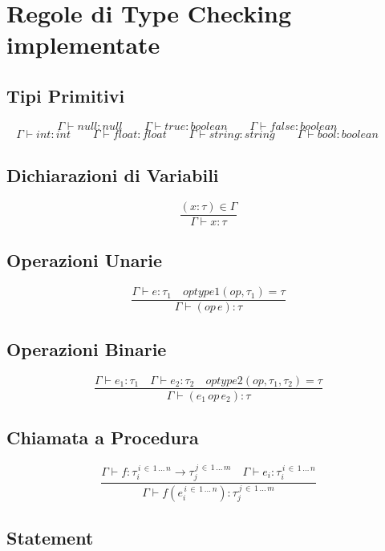\documentclass[a4paper,12pt]{article}
\newcommand\mi[1]{\mathit{#1}}
\begin{document}
	\newpage
    \section{Regole di Type Checking implementate}
    \subsection{Tipi Primitivi}
    \[
        \Gamma \vdash null \colon null \qquad
        \Gamma \vdash true \colon boolean \qquad
        \Gamma \vdash false \colon boolean \qquad
    \]
    \[
        \Gamma \vdash \mi{int} \colon int \qquad
        \Gamma \vdash \mi{float} \colon float \qquad
        \Gamma \vdash \mi{string} \colon string \qquad
        \Gamma \vdash \mi{bool}    \colon boolean \qquad
    \]
    \subsection{Dichiarazioni di Variabili}
    \[
        \frac{(x \colon \tau) \in \Gamma}{\Gamma \vdash x \colon \tau}
    \]
    \subsection{Operazioni Unarie}
    \[
        \frac {\Gamma \vdash \mi{e} \colon \tau_1 \quad optype1(op,\tau_1) = \tau} %
              {\Gamma \vdash (op \, \mi{e}) \colon \tau}
    \]
    \subsection{Operazioni Binarie}
    \[
        \frac {\Gamma \vdash \mi{e_1} \colon \tau_1 \quad \Gamma \vdash \mi{e_2} \colon \tau_2  \quad optype2(op,\tau_1, \tau_2) = \tau} %
        {\Gamma \vdash (\mi{e_1}\, op \, \mi{e_2}) \colon \tau}
    \]
    \subsection{Chiamata a Procedura}
    \[
        \frac {\Gamma \vdash \mi{f} \colon \tau_i^{\,i \, \in \,1 \, \dots \, n} \to \tau_j^{\,j \, \in \, 1 \, \dots \, m} \quad \Gamma \vdash \mi{e_i} \colon %
        \tau_i^{\, i \, \in \, 1 \, \dots \, n}} %
        {\Gamma \vdash \mi{f}(\mi{e}_i^{\, i \, \in \, 1 \, \dots \, n})\colon \tau_j^{\, j \, \in \, 1 \, \dots \, m}}
    \]
    
    \subsection{Statement}
\end{document}
